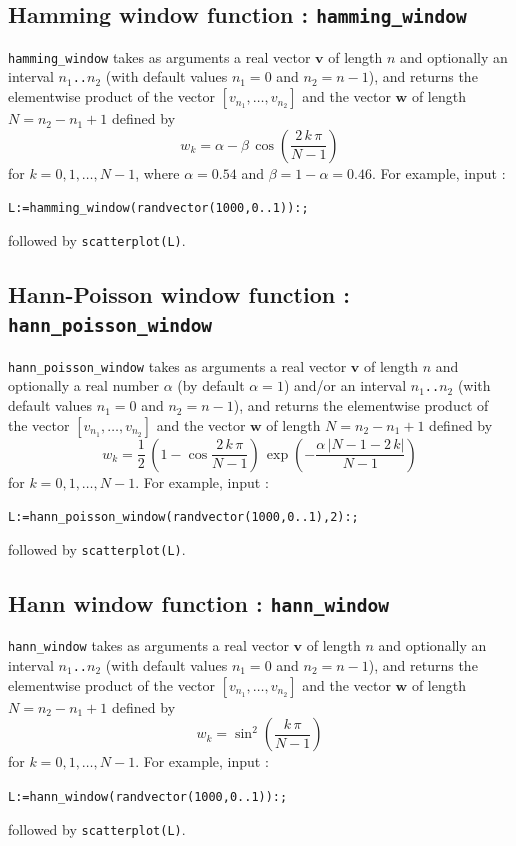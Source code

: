 \documentclass[a4paper,11pt]{book}
\begin{document}
\subsection{Hamming window function : {\tt hamming\_window}}
{\tt hamming\_window} takes as arguments a real vector $ \mathbf{v} $ of length $ n $ and optionally an interval $ n_1 ${\tt ..}$ n_2 $ (with default values $ n_1=0 $ and $ n_2=n-1 $), and returns the elementwise product of the vector $ [v_{n_1},\dots,v_{n_2}] $ and the vector $ \mathbf{w} $ of length $ N=n_2-n_1+1 $ defined by
\[ w_k=\alpha-\beta\,\cos\left(\frac{2\,k\,\pi}{N-1}\right) \]
for $ k=0,1,\dots,N-1 $, where $ \alpha=0.54 $ and $ \beta=1-\alpha=0.46 $. For example, input :
\begin{center}
	{\tt L:=hamming\_window(randvector(1000,0..1)):;}
\end{center}
followed by {\tt scatterplot(L)}.

\subsection{Hann-Poisson window function : {\tt hann\_poisson\_window}}
{\tt hann\_poisson\_window} takes as arguments a real vector $ \mathbf{v} $ of length $ n $ and optionally a real number $ \alpha $ (by default $ \alpha=1 $) and/or an interval $ n_1 ${\tt ..}$ n_2 $ (with default values $ n_1=0 $ and $ n_2=n-1 $), and returns the elementwise product of the vector $ [v_{n_1},\dots,v_{n_2}] $ and the vector $ \mathbf{w} $ of length $ N=n_2-n_1+1 $ defined by
\[ w_k=\frac{1}{2}\,\left(1-\cos\frac{2\,k\,\pi}{N-1}\right)\,\exp\left(-\frac{\alpha\,|N-1-2\,k|}{N-1}\right) \]
for $ k=0,1,\dots,N-1 $. For example, input :
\begin{center}
	{\tt L:=hann\_poisson\_window(randvector(1000,0..1),2):;}
\end{center}
followed by {\tt scatterplot(L)}.

\subsection{Hann window function : {\tt hann\_window}}
{\tt hann\_window} takes as arguments a real vector $ \mathbf{v} $ of length $ n $ and optionally an interval $ n_1 ${\tt ..}$ n_2 $ (with default values $ n_1=0 $ and $ n_2=n-1 $), and returns the elementwise product of the vector $ [v_{n_1},\dots,v_{n_2}] $ and the vector $ \mathbf{w} $ of length $ N=n_2-n_1+1 $ defined by
\[ w_k=\sin^2\left(\frac{k\,\pi}{N-1}\right) \]
for $ k=0,1,\dots,N-1 $. For example, input :
\begin{center}
	{\tt L:=hann\_window(randvector(1000,0..1)):;}
\end{center}
followed by {\tt scatterplot(L)}.
\end{document}
